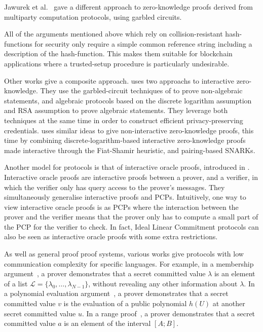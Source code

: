 Jawurek et al.~\cite{JawurekKO13} gave a different approach to zero-knowledge proofs derived from multiparty computation protocols, using garbled circuits.

All of the arguments mentioned above which rely on collision-resistant hash-functions for security only require a simple common reference string including a description of the hash-function. This makes them suitable for blockchain applications where a trusted-setup procedure is particularly undesirable.

Other works give a composite approach. \cite{ChaseGM16} uses two approachs to interactive zero-knowledge. They use the garbled-circuit techniques of \cite{JawurekKO13} to prove non-algebraic statements, and algebraic protocols based on the discrete logarithm assumption and RSA assumption to prove algebraic statements. They leverage both techniques at the same time in order to construct efficient privacy-preserving credentials. \cite{AgrawalGM18} uses similar ideas to give non-interactive zero-knowledge proofs, this time by combining discrete-logarithm-based interactive zero-knowledge proofs made interactive through the Fiat-Shamir heuristic, and pairing-based SNARKs.

Another model for protocols is that of interactive oracle proofs, introduced in \cite{Ben-SassonCS16}. Interactive oracle proofs are interactive proofs between a prover, and a verifier, in which the verifier only has query access to the prover's messages. They simultaneously generalise interactive proofs and PCPs. Intuitively, one way to view interactive oracle proofs is as PCPs where the interaction between the prover and the verifier means that the prover only has to compute a small part of the PCP for the verifier to check. In fact, Ideal Linear Commitment protocols can also be seen as interactive oracle proofs with some extra restrictions.

As well as general proof proof systems, various works give protocols with low communication complexity for specific languages. For example, in a membership argument~\cite{BS01,BDD07}, a prover demonstrates that a secret committed value $\lambda$ is an element of a list $\mathcal{L} = \{ \lambda_0,\ldots,\lambda_{N-1}\}$, without revealing any other information about $\lambda$. In a polynomial evaluation argument~\cite{FO97,BDD07}, a prover demonstrates that a secret committed value $v$ is the evaluation of a public polynomial $h(U)$ at another secret committed value $u$. In a range proof~\cite{Bou02,Lip03}, a prover demonstrates that a secret committed value $a$ is an element of the interval $[A;B]$.

